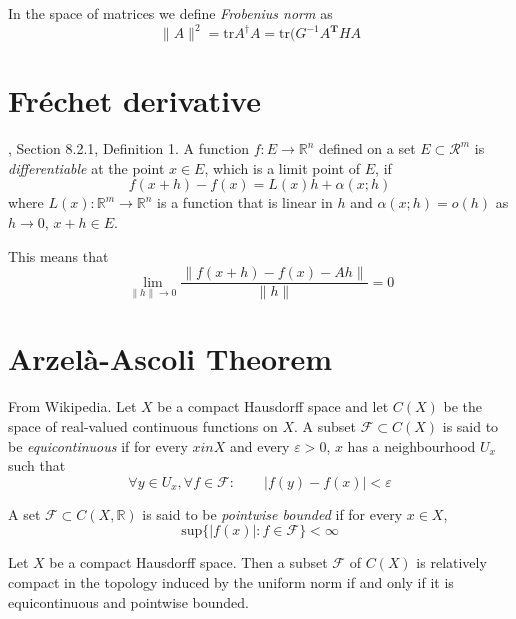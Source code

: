 \begin{definition}
\label{definition-Frobenius-norm}
In the space of matrices we define {\it Frobenius norm} as
\begin{equation}
\label{equation-Frobenius-norm}
\|A\|^2=\text{tr}A^\dag A=\text{tr}(G^{-1}A^{\mathbf{T}}HA
\end{equation}
\end{definition}

\section{Fréchet derivative}
\label{section-Fréchet-derivative}

\begin{definition}
\label{definition-Frechet-derivative}
\cite{zo1}, Section 8.2.1, Definition 1. A function $f:E \to \mathbb{R}^n$
defined on a set $E \subset \mathcal{R}^m$ is {\it differentiable} at the point
$x \in E$, which is a limit point of $E$, if
$$
f(x+h)-f(x)=L(x)h+\alpha(x;h)
$$
where $L(x):\mathbb{R}^m\to \mathbb{R}^n$ is a function that is linear in $h$
and $\alpha(x;h)=o(h)$ as $h\to 0$, $x+h\in E$.
\end{definition}

This means that
$$
\lim_{\|h\|\to 0} \frac{\|f(x+h)-f(x)-Ah\|}{\|h\|}=0
$$

\section{Arzelà-Ascoli Theorem}
\label{section-Arzela-Ascoli-theorem}
\begin{definition}
\label{definition-equicontinuous}
From Wikipedia. Let $X$ be a compact Hausdorff space and let  $C(X)$ be the
space of real-valued continuous functions on $X$. A subset $\mathcal{F} \subset
C(X)$ is said to be {\it equicontinuous} if for every $x in X$ and every
$\varepsilon>0$, $x$ has a neighbourhood $U_x$ such that
$$
\forall y \in U_x, \forall f \in \mathcal{F}: \qquad |f(y)-f(x)|<\varepsilon
$$
\end{definition}

\begin{definition}
\label{definition-pointwise-bounded}
A set $\mathcal{F}\subset C(X,\mathbb{R})$ is said to be {\it pointwise
bounded} if for every $x \in X$,
$$
\text{sup}\{|f(x)|:f \in \mathcal{F}\}<\infty
$$
\end{definition}

\begin{theorem}
\label{theorem-Arzela-Ascoli}
Let $X$ be a compact Hausdorff space. Then a subset $\mathcal{F}$ of $C(X)$ is
relatively compact in the topology induced by the uniform norm if and only if it
is equicontinuous and pointwise bounded.
\end{theorem}







